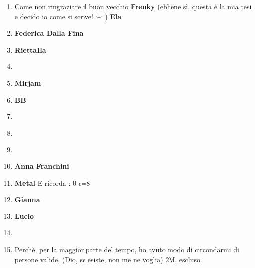 \documentclass[11pt]{amsart}
\newcommand{\n}[1]{{\bf #1}}
\begin{document}
\begin{enumerate}[]
\item Come non ringraziare il buon vecchio \n{Frenky} (ebbene sì, questa è la mia tesi e decido io come si scrive! $\ddot\smile$ )  \n{Ela}
\item \n{Federica Dalla Fina}
\item \n{RiettaIla}
\item \n{} \smiley
\frownie
\item \n{Mirjam}
\item \n{BB}
\item \n{}
\item \n{}
\item \n{}
\item \n{Anna Franchini}
\item \n{Metal} E ricorda :-0 $\epsilon$=8
\item \n{Gianna}
\item \n{Lucio}
\item \n{}
\item Perchè, per la maggior parte del tempo, ho avuto modo di circondarmi di persone valide, (Dio, se esiste, non me ne voglia) 2M. escluso.
\n{}


\end{enumerate}
\end{document}
